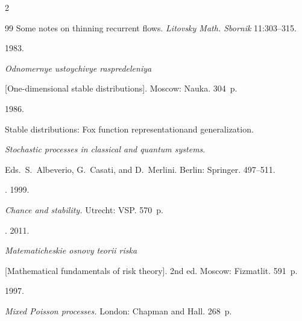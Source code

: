 \begin{multicols}{2}
{{\begin{thebibliography}{99}
    Some notes on thinning recurrent flows. \textit{Litovsky Math. Sbornik} 11:303--315.


    




     1983.


    \textit{Odnomernye ustoychivye raspredeleniya} 


    [One-dimensional stable distributions]. Moscow: Nauka. 304~p.


    


    




     1986.


    Stable distributions: Fox function representationand generalization. 


    \textit{Stochastic processes in classical and quantum systems}. 


    Eds.\ S.~Albeverio, G.~Casati, and D.~Merlini. Berlin: Springer. 497--511.


    




    . 1999.


    \textit{Chance and stability.} Utrecht: VSP. 570~p.


    




. 2011.


    \textit{Matematicheskie osnovy teorii riska} 


    [Mathematical fundamentals of risk theory]. 2nd ed. Moscow: Fizmatlit. 591~p.


    




 1997.


    \textit{Mixed Poisson processes.} London: Chapman and Hall. 268~p.


    





\end{thebibliography}}}
\end{multicols}
